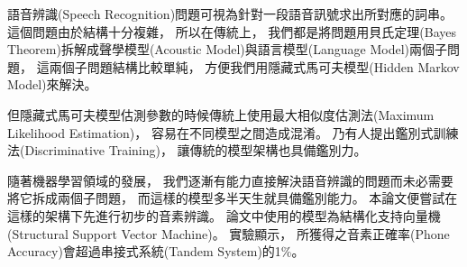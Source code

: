 \NTUtitlepage  %

\newpage
\setcounter{page}{1}

\NTUoralpage  %

\mydoublespacing

\begin{zhAbstract}  %
  語音辨識(Speech Recognition)問題可視為針對一段語音訊號求出所對應的詞串。
  這個問題由於結構十分複雜，
  所以在傳統上，
  我們都是將問題用貝氏定理(Bayes Theorem)拆解成聲學模型(Acoustic Model)與語言模型(Language Model)兩個子問題，
  這兩個子問題結構比較單純，
  方便我們用隱藏式馬可夫模型(Hidden Markov Model)來解決。

  但隱藏式馬可夫模型估測參數的時候傳統上使用最大相似度估測法(Maximum Likelihood Estimation)，
  容易在不同模型之間造成混淆。
  乃有人提出鑑別式訓練法(Discriminative Training)，
  讓傳統的模型架構也具備鑑別力。

  隨著機器學習領域的發展，
  我們逐漸有能力直接解決語音辨識的問題而未必需要將它拆成兩個子問題，
  而這樣的模型多半天生就具備鑑別能力。
  本論文便嘗試在這樣的架構下先進行初步的音素辨識。
  論文中使用的模型為結構化支持向量機(Structural Support Vector Machine)。
  實驗顯示，
  所獲得之音素正確率(Phone Accuracy)會超過串接式系統(Tandem System)的1\%。

\end{zhAbstract}

{
\mysinglespacing\selectfont
\tableofcontents %

\listoffigures  %

\listoftables  %
\par
}

\newpage
\setcounter{page}{1}
